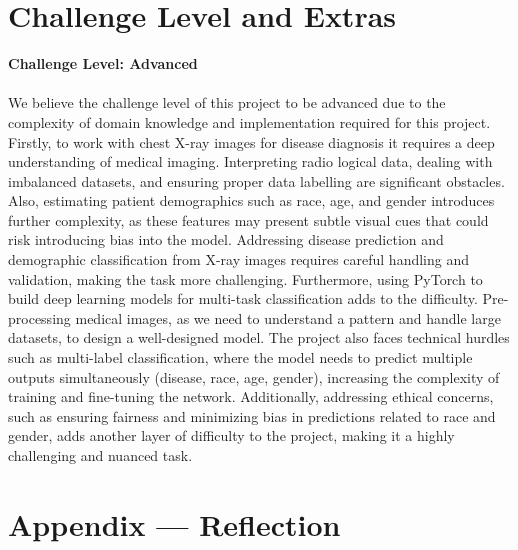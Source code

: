 \documentclass{article}
\begin{document}
\section{Challenge Level and Extras}

\textbf{Challenge Level: Advanced} \\ \\ 
We believe the challenge level of this project to be advanced due to the complexity of domain knowledge and implementation required for this project. Firstly, to work with chest X-ray images for disease diagnosis it requires a deep understanding of medical imaging. Interpreting radio logical data, dealing with imbalanced datasets, and ensuring proper data labelling are significant obstacles. Also, estimating patient demographics such as race, age, and gender introduces further complexity, as these features may present subtle visual cues that could risk introducing bias into the model. Addressing disease prediction and demographic classification from X-ray images requires careful handling and validation, making the task more challenging.
Furthermore, using PyTorch to build deep learning models for multi-task classification adds to the difficulty. Pre-processing medical images, as we need to understand a pattern and handle large datasets, to design a well-designed model. The project also faces technical hurdles such as multi-label classification, where the model needs to predict multiple outputs simultaneously (disease, race, age, gender), increasing the complexity of training and fine-tuning the network. Additionally, addressing ethical concerns, such as ensuring fairness and minimizing bias in predictions related to race and gender, adds another layer of difficulty to the project, making it a highly challenging and nuanced task.

\newpage{}

\section*{Appendix --- Reflection}
\end{document}
